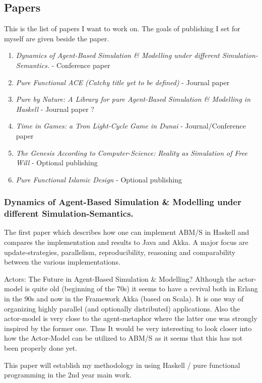 \subsection{Papers}
This is the list of papers I want to work on. The goals of publishing I set for myself are given beside the paper.

\begin{enumerate}
\item \textit{Dynamics of Agent-Based Simulation \& Modelling under different Simulation-Semantics.} - Conference paper
\item \textit{Pure Functional ACE (Catchy title yet to be defined)} - Journal paper
\item \textit{Pure by Nature: A Library for pure Agent-Based Simulation \& Modelling in Haskell} - Journal paper ?
\item \textit{Time in Games: a Tron Light-Cycle Game in Dunai} - Journal/Conference paper
\item \textit{The Genesis According to Computer-Science: Reality as Simulation of Free Will} - Optional publishing
\item \textit{Pure Functional Islamic Design} - Optional publishing
\end{enumerate}

\subsubsection{Dynamics of Agent-Based Simulation \& Modelling under different Simulation-Semantics.}
The first paper which describes how one can implement ABM/S in Haskell and compares the implementation and results to Java and Akka. A major focus are update-strategies, parallelism, reproducibility, reasoning and comparability between the various implementations. 

Actors: The Future in Agent-Based Simulation \& Modelling?
Although the actor-model is quite old (beginning of the 70s) it seems to have a revival both in Erlang in the 90s and now in the Framework Akka (based on Scala). It is one way of organizing highly parallel (and optionally distributed) applications. Also the actor-model is very close to the agent-metaphor where the latter one was strongly inspired by the former one. Thus It would be very interesting to look closer into how the Actor-Model can be utilized to ABM/S as it seems that this has not been properly done yet.

This paper will establish my methodology in using Haskell / pure functional programming in the 2nd year main work.


